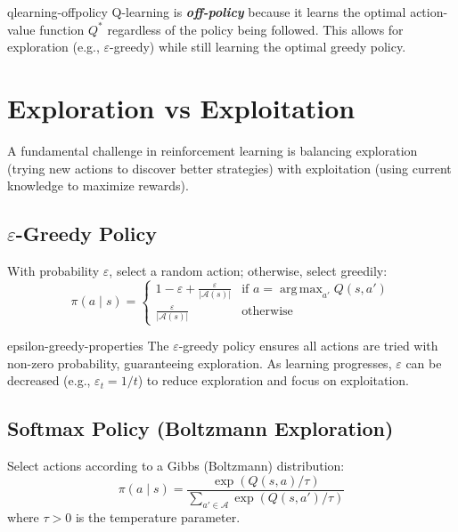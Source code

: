\documentclass[a4paper, 11pt]{article}
\numberwithin{equation}{section}
\theoremstyle{plain}
\theoremstyle{definition}
\newcommand{\1}{{\mathbbm 1}}
\newcommand{\mc}[1]{\mathcal{#1}}
\DeclareMathOperator*{\argmax}{arg\,max}
\newcommand{\bi}[1]{\textbf{\textit{#1}}}
\begin{document}
	\begin{frema}{}{qlearning-offpolicy}
		Q-learning is \bi{off-policy} because it learns the optimal action-value function $Q^*$ regardless of the policy being followed. This allows for exploration (e.g., $\varepsilon$-greedy) while still learning the optimal greedy policy.
	\end{frema}
	
	\section{Exploration vs Exploitation}
	
	A fundamental challenge in reinforcement learning is balancing exploration (trying new actions to discover better strategies) with exploitation (using current knowledge to maximize rewards).
	
	\subsection{$\varepsilon$-Greedy Policy}
	
	With probability $\varepsilon$, select a random action; otherwise, select greedily:
	\begin{equation}\label{epsilon-greedy}
		\pi(a\;|\; s) = \begin{cases}
			1 - \varepsilon + \frac{\varepsilon}{|\mc{A}(s)|} & \text{if } a = \argmax_{a'} Q(s, a') \\
			\frac{\varepsilon}{|\mc{A}(s)|} & \text{otherwise}
		\end{cases}
	\end{equation}
	
	\begin{frema}{}{epsilon-greedy-properties}
		The $\varepsilon$-greedy policy ensures all actions are tried with non-zero probability, guaranteeing exploration. As learning progresses, $\varepsilon$ can be decreased (e.g., $\varepsilon_t = 1/t$) to reduce exploration and focus on exploitation.
	\end{frema}
	
	\subsection{Softmax Policy (Boltzmann Exploration)}
	
	Select actions according to a Gibbs (Boltzmann) distribution:
	\begin{equation}\label{softmax-policy}
		\pi(a\;|\; s) = \frac{\exp(Q(s, a) / \tau)}{\sum_{a' \in \mc{A}} \exp(Q(s, a') / \tau)}
	\end{equation}
	where $\tau > 0$ is the temperature parameter.
	
\end{document}
